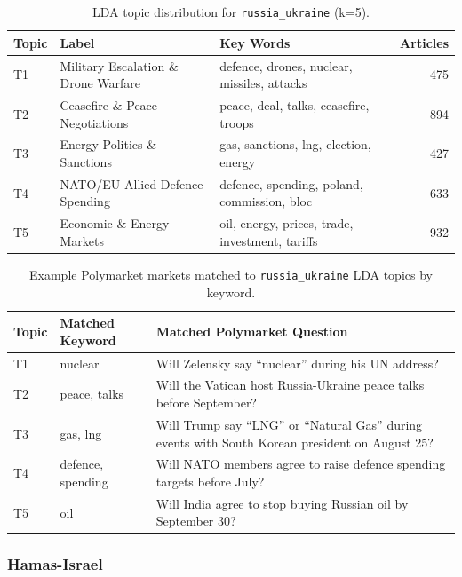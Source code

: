 \documentclass[11pt,a4paper]{article}
\begin{document}
\begin{table}[H]
\centering
\begin{tabular}{llp{6cm}r}
\hline
\textbf{Topic} & \textbf{Label} & \textbf{Key Words} & \textbf{Articles} \\
\hline
T1 & Military Escalation \& Drone Warfare & defence, drones, nuclear, missiles, attacks & 475 \\
T2 & Ceasefire \& Peace Negotiations & peace, deal, talks, ceasefire, troops & 894 \\
T3 & Energy Politics \& Sanctions & gas, sanctions, lng, election, energy & 427 \\
T4 & NATO/EU Allied Defence Spending & defence, spending, poland, commission, bloc & 633 \\
T5 & Economic \& Energy Markets & oil, energy, prices, trade, investment, tariffs & 932 \\
\hline
\end{tabular}
\caption{LDA topic distribution for \texttt{russia\_ukraine} (k=5).}
\label{tab:lda_russia_ukraine}
\end{table}

\begin{table}[H]
\centering
\begin{tabular}{p{1cm}p{4.8cm}p{9.5cm}}
\hline
\textbf{Topic} & \textbf{Matched Keyword} & \textbf{Matched Polymarket Question} \\
\hline
T1 & nuclear & Will Zelensky say ``nuclear'' during his UN address? \\
T2 & peace, talks & Will the Vatican host Russia-Ukraine peace talks before September? \\
T3 & gas, lng & Will Trump say ``LNG'' or ``Natural Gas'' during events with South Korean president on August 25? \\
T4 & defence, spending & Will NATO members agree to raise defence spending targets before July? \\ %
T5 & oil & Will India agree to stop buying Russian oil by September 30? \\
\hline
\end{tabular}
\caption{Example Polymarket markets matched to \texttt{russia\_ukraine} LDA topics by keyword.}
\label{tab:polymarket_russia_ukraine}
\end{table}

\subsubsection*{Hamas-Israel}
\end{document}
